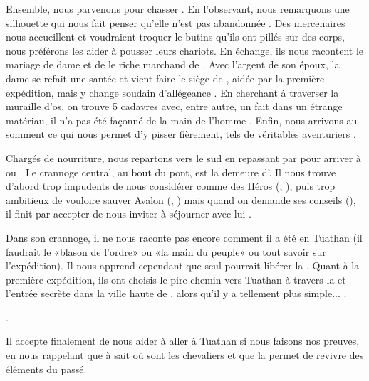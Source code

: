 \documentclass[11pt]{article}
\begin{document}
Ensemble, nous parvenons \sousmuraille{} pour chasser . En l'observant, nous remarquons une silhouette qui nous fait penser qu'elle n'est pas abandonnée . Des mercenaires nous accueillent et voudraient troquer le butins qu'ils ont pillés sur des corps, nous préférons les aider à pousser leurs chariots. En échange, ils nous racontent le mariage de dame \kincaid{} et de \ultan{} le riche marchand de \boismuraille. Avec l'argent de son époux, la dame se refait une santée et vient faire le siège de \boismuraille{}, aidée par la première expédition, mais \yvain{} y change soudain d'allégeance . En cherchant à traverser la muraille d'os, on trouve 5 cadavres avec, entre autre, un \talismanterni{} fait dans un étrange matériau, il n'a pas été façonné de la main de l'homme . Enfin, nous arrivons au somment ce qui nous permet d'y pisser fièrement, tels de véritables aventuriers .

Chargés de nourriture, nous repartons vers le sud en repassant par \debacle{} pour arriver à \bordwyrd{}  ou . Le crannoge central, au bout du pont, est la demeure d'\orrin{}. Il nous trouve d'abord trop impudents de nous considérer comme des Héros (, \rep[-2]), puis trop ambitieux de vouloire sauver Avalon (, \rep[-2]) mais quand on demande ses conseils (), il finit par accepter de nous inviter à séjourner avec lui .

Dans son crannoge, il ne nous raconte pas encore comment il a été en Tuathan (il faudrait le «blason de l'ordre» ou «la main du peuple» ou tout savoir sur l'expédition). Il nous apprend cependant que seul \arthur{} pourrait libérer la \flotte{}. Quant à la première expédition, ils ont choisis le pire chemin vers Tuathan à travers la \valleegardiens{} et l'entrée secrète dans la ville haute de \boismuraille{}, alors qu'il y a tellement plus simple... .

.

Il accepte finalement de nous aider à aller à Tuathan si nous faisons nos preuves, en nous rappelant que \lancelot{} à \newcamelot{} sait où sont les chevaliers et que la \tetesereine{} permet de revivre des éléments du passé.
\end{document}
